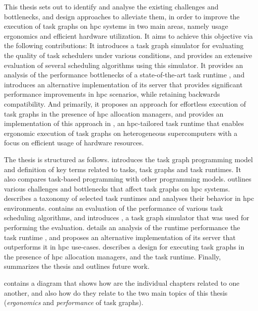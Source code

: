 This thesis sets out to identify and analyse the existing challenges and bottlenecks, and design
approaches to alleviate them, in order to improve the execution of task graphs on
\gls{hpc} systems in two main areas, namely usage ergonomics and efficient hardware
utilization. It aims to achieve this objective via the following contributions: It introduces a
task graph simulator for evaluating the quality of task schedulers under various conditions, and
provides an extensive evaluation of several scheduling algorithms using this simulator. It provides
an analysis of the performance bottlenecks of a state-of-the-art task runtime
\dask{}, and introduces an alternative implementation of its server that provides
significant performance improvements in \gls{hpc} scenarios, while retaining backwards
compatibility. And primarily, it proposes an approach for effortless execution of task graphs in
the presence of \gls{hpc} allocation managers, and provides an implementation of this
approach in \hyperqueue{}, an \gls{hpc}-tailored task runtime that enables
ergonomic execution of task graphs on heterogeneous supercomputers with a focus on efficient usage
of hardware resources.

The thesis is structured as follows.  introduces the task graph programming
model and definition of key terms related to tasks, task graphs and task runtimes. It also compares
task-based programming with other programming models.  outlines various
challenges and bottlenecks that affect task graphs on \gls{hpc} systems.
 describes a taxonomy of selected task runtimes and analyses their behavior
in \gls{hpc} environments.  contains an evaluation of the
performance of various task scheduling algorithms, and introduces \estee{}, a task
graph simulator that was used for performing the evaluation.  details an
analysis of the runtime performance the task runtime \dask{}, and proposes an
alternative implementation of its server that outperforms it in \gls{hpc} use-cases.
 describes a design for executing task graphs in the presence of
\gls{hpc} allocation managers, and the \hyperqueue{} task runtime. Finally,
 summarizes the thesis and outlines future work.

 contains a diagram that shows how are the individual chapters related
to one another, and also how do they relate to the two main topics of this thesis
(\emph{ergonomics} and \emph{performance} of task graphs).

